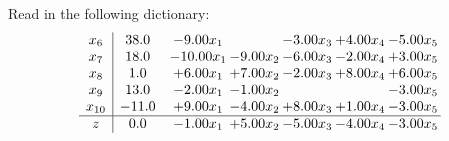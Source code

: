 \documentclass[9pt]{article}
\begin{document}
Read in the following dictionary:
\[\begin{array}{c| c c@{\hskip 2pt} c@{\hskip 2pt} c@{\hskip 2pt} c@{\hskip 2pt} c@{\hskip 2pt} }
 x_{6}   &  38.0 & -9.00 x_{1} &   & -3.00 x_{3} & +  4.00 x_{4} & -5.00 x_{5}\\
 x_{7}   &  18.0 & -10.00 x_{1} & -9.00 x_{2} & -6.00 x_{3} & -2.00 x_{4} & +  3.00 x_{5}\\
 x_{8}   &  1.0 & +  6.00 x_{1} & +  7.00 x_{2} & -2.00 x_{3} & +  8.00 x_{4} & +  6.00 x_{5}\\
 x_{9}   &  13.0 & -2.00 x_{1} & -1.00 x_{2} &    &   & -3.00 x_{5}\\
 x_{10}   &  -11.0 & +  9.00 x_{1} & -4.00 x_{2} & +  8.00 x_{3} & +  1.00 x_{4} & -3.00 x_{5}\\
\hline
z    &  0.0 & -1.00 x_{1} & +  5.00 x_{2} & -5.00 x_{3} & -4.00 x_{4} & -3.00 x_{5}\\
\end{array}\]
\end{document}
